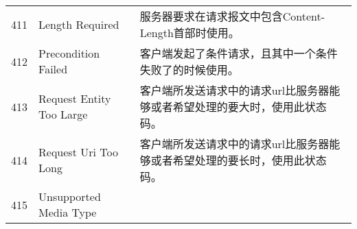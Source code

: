 \begin{longtable}[]{@{}cll@{}}
\begin{minipage}[t]{0.32\columnwidth}
411\strut
\end{minipage} & \begin{minipage}[t]{0.30\columnwidth}\raggedright\strut
Length Required\strut
\end{minipage} & \begin{minipage}[t]{0.30\columnwidth}\raggedright\strut
服务器要求在请求报文中包含Content-Length首部时使用。\strut
\end{minipage}\tabularnewline
\begin{minipage}[t]{0.32\columnwidth}\centering\strut
412\strut
\end{minipage} & \begin{minipage}[t]{0.30\columnwidth}\raggedright\strut
Precondition Failed\strut
\end{minipage} & \begin{minipage}[t]{0.30\columnwidth}\raggedright\strut
客户端发起了条件请求，且其中一个条件失败了的时候使用。\strut
\end{minipage}\tabularnewline
\begin{minipage}[t]{0.32\columnwidth}\centering\strut
413\strut
\end{minipage} & \begin{minipage}[t]{0.30\columnwidth}\raggedright\strut
Request Entity Too Large\strut
\end{minipage} & \begin{minipage}[t]{0.30\columnwidth}\raggedright\strut
客户端所发送请求中的请求url比服务器能够或者希望处理的要大时，使用此状态码。\strut
\end{minipage}\tabularnewline
\begin{minipage}[t]{0.32\columnwidth}\centering\strut
414\strut
\end{minipage} & \begin{minipage}[t]{0.30\columnwidth}\raggedright\strut
Request Uri Too Long\strut
\end{minipage} & \begin{minipage}[t]{0.30\columnwidth}\raggedright\strut
客户端所发送请求中的请求url比服务器能够或者希望处理的要长时，使用此状态码。\strut
\end{minipage}\tabularnewline
\begin{minipage}[t]{0.32\columnwidth}\centering\strut
415\strut
\end{minipage} & \begin{minipage}[t]{0.30\columnwidth}\raggedright\strut
Unsupported Media Type\strut
\end{minipage} & \begin{minipage}[t]{0.30\columnwidth}\raggedright\strut

\end{minipage}
\end{longtable}
